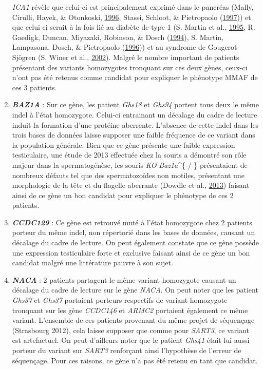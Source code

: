 \documentclass[12pt,twoside]{reedthesis}
\theoremstyle{definition}
\theoremstyle{definition}
\theoremstyle{remark}
\begin{document}
\begin{enumerate}
    \emph{ICA1} révèle que celui-ci est principalement exprimé dans le
    pancréas (Mally, Cirulli, Hayek, \& Otonkoski,
    \protect\hyperlink{ref-Mally1996}{1996}, Stassi, Schloot, \&
    Pietropaolo (\protect\hyperlink{ref-Stassi1997}{1997})) et que
    celui-ci serait à la fois lié au diabète de type 1 (S. Martin et al.,
    \protect\hyperlink{ref-Martin1995}{1995}, R. Gaedigk, Duncan,
    Miyazaki, Robinson, \& Dosch
    (\protect\hyperlink{ref-Gaedigk1994}{1994}), S. Martin, Lampasona,
    Dosch, \& Pietropaolo (\protect\hyperlink{ref-Martin1996}{1996})) et
    au syndrome de Gougerot-Sjögren (S. Winer et al.,
    \protect\hyperlink{ref-Winer2002}{2002}). Malgré le nombre important
    de patients présentant des variants homozygotes tronquant sur ces deux
    gènes, ceux-ci n'ont pas été retenus comme candidat pour expliquer le
    phénotype MMAF de ces 3 patients.
  \item
    \textbf{\emph{BAZ1A}} : Sur ce gène, les patient \emph{Ghs18} et
    \emph{Ghs94} portent tous deux le même indel à l'état homozygote.
    Celui-ci entrainant un décalage du cadre de lecture induit la
    formation d'une protéine aberrente. L'absence de cette indel dans les
    trois bases de données laisse supposer une faible fréquence de ce
    variant dans la population générale. Bien que ce gène présente une
    faible expression testiculaire, une étude de 2013 effectuée chez la
    souris a démontré son rôle majeur dans la spermatogénèse, les souris
    \emph{KO} \emph{Baz1a}\^{}\{-/-\} présentaient de nombreux défauts tel
    que des spermatozoïdes non motiles, présentant une morphologie de la
    tête et du flagelle aberrante (Dowdle et al.,
    \protect\hyperlink{ref-Dowdle2013}{2013}) faisant ainsi de ce gène un
    bon candidat pour expliquer le phénotype de ces 2 patients.
  \item
    \textbf{\emph{CCDC129}} : Ce gène est retrouvé muté à l'état
    homozygote chez 2 patients porteur du même indel, non répertorié dans
    les bases de données, causant un décalage du cadre de lecture. On peut
    également constate que ce gène possède une expression testiculaire
    forte et exclusive faisant ainsi de ce gène un bon candidat malgré une
    littérature pauvre à son sujet.
  \item
    \textbf{\emph{NACA}} : 2 patients partagent le même variant homozygote
    causant un décalage du cadre de lecture sur le gène \emph{NACA}. On
    peut noter que les patient \emph{Ghs37} et \emph{Ghs37} portaient
    porteurs respectifs de variant homozygote tronquant sur les gène
    \emph{CCDC146} et \emph{ARMC2} portaient également ce même variant.
    L'ensemble de ces patients provenant du même projet de séquençage
    (Strasbourg 2012), cela laisse supposer que comme pour \emph{SART3},
    ce variant est artefactuel. On peut d'ailleurs noter que le patient
    \emph{Ghs41} était lui aussi porteur du variant sur \emph{SART3}
    renforçant ainsi l'hypothèse de l'erreur de séquençage. Pour ces
    raisons, ce gène n'a pas été retenu en tant que candidat.
  \end{enumerate}
  
\end{document}
